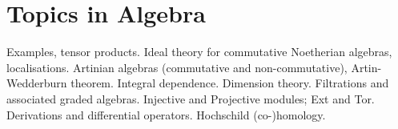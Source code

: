\documentclass[main.tex]{subfiles}
\begin{document}
	\chapter{Topics in Algebra}
Examples, tensor products. Ideal theory for commutative Noetherian algebras, localisations. Artinian
algebras (commutative and non-commutative), Artin-Wedderburn theorem. Integral dependence. Dimension theory. Filtrations and associated graded algebras. Injective and Projective modules; Ext and Tor.
Derivations and differential operators. Hochschild (co-)homology.
\end{document}
